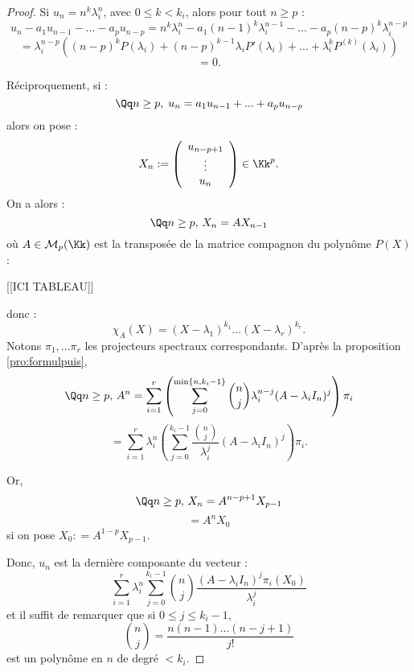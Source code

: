 \documentclass[class=report,crop=false]{standalone}
\begin{document}
\begin{proof}
Si $u_n = n^k\lambda_i^n$, avec $0 \le k < k_i$, alors pour tout $n \ge p$ :
\[u_n -a_1u_{n-1}-...-a_pu_{n-p} = n^k\lambda_i^n - a_1 (n-1)^k \lambda_i^{n-1} - ... - a_p (n-p)^k\lambda_i^{n-p}\]
\[= \lambda_i^{n-p}\left((n-p)^k P(\lambda_i) + (n-p)^{k-1}\lambda_iP'(\lambda_i) + ... + \lambda_i^kP^{(k)}(\lambda_i)\right) \]
\[= 0 .\]

Réciproquement, si :
\[\Qq n \ge p ,\; u_n= a_1 u_{n-1} +...+ a_pu_{n-p}\]
alors on pose :
\[X_n:=\left(\begin{array}{c}
u_{n-p+1}\\
\vdots\\
u_n
\end{array}\right) \in \Kk^p .\]
On a alors :
\[\Qq n\ge p,\, X_n = A X_{n-1}\]
où $A\in \mathcal{M}_p(\Kk)$ est la transposée de la matrice compagnon du polynôme $P(X)$ :

[[ICI TABLEAU]]



donc :
\[\chi_A(X) = (X-\lambda_1)^{k_1}...(X-\lambda_r)^{k_r} .\]
Notons $\pi_1,...\pi_r$ les projecteurs spectraux correspondants. D'après la proposition \ref{pro:formulpuis}, 
\[\Qq n \ge p,\, A^n =  \sum_{i = 1}^r \left( \sum_{j=0}^{\min \{n,k_i-1\}} {n \choose j} \lambda_i^{n-j}(A-\lambda_iI_n)^j \right) \pi_i \]
\[= \sum_{i = 1}^r \lambda_i^n \left(\sum_{j=0}^{k_i-1} \frac{{n \choose j}}{\lambda_i^j} (A-\lambda_iI_n)^j \right)\pi_i .\]

Or, \[ \Qq n \ge p,\, X_n = A^{n-p+1}X_{p-1}\]
\[ = A^nX_0\]
si on pose $X_0 : = A^{1-p}X_{p-1}$. 

Donc, $u_n$ est la dernière composante du vecteur :
\[\sum_{i = 1}^r \lambda_i^n \sum_{j=0}^{k_i-1} {n \choose j}\frac{(A-\lambda_iI_n)^j\pi_i(X_0)}{\lambda_i^j}  \]
et il suffit de remarquer que si $0 \le j \le k_i-1$, \[{n \choose j} = \frac{n(n-1)...(n-j+1)}{j!}\] est un polynôme en $n$ de degré $< k_i$.
\end{proof}

\end{document}
